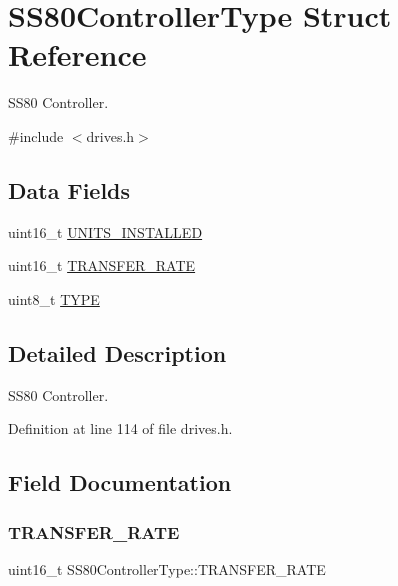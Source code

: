 \hypertarget{structSS80ControllerType}{}\section{S\+S80\+Controller\+Type Struct Reference}
\label{structSS80ControllerType}


S\+S80 Controller.  




{\ttfamily \#include $<$drives.\+h$>$}

\subsection*{Data Fields}
\begin{DoxyCompactItemize}
\item 
uint16\+\_\+t \hyperlink{structSS80ControllerType_a0868c32b362ef2af2ac64fa16aee8aae}{U\+N\+I\+T\+S\+\_\+\+I\+N\+S\+T\+A\+L\+L\+ED}
\item 
uint16\+\_\+t \hyperlink{structSS80ControllerType_a98a3f1a7de63398531426b5781cb0090}{T\+R\+A\+N\+S\+F\+E\+R\+\_\+\+R\+A\+TE}
\item 
uint8\+\_\+t \hyperlink{structSS80ControllerType_a255739680bca0ad3b4d1346cf5017332}{T\+Y\+PE}
\end{DoxyCompactItemize}


\subsection{Detailed Description}
S\+S80 Controller. 

Definition at line 114 of file drives.\+h.



\subsection{Field Documentation}
\mbox{\label{structSS80ControllerType_a98a3f1a7de63398531426b5781cb0090}} 
\subsubsection{\texorpdfstring{T\+R\+A\+N\+S\+F\+E\+R\+\_\+\+R\+A\+TE}{TRANSFER\_RATE}}
{\footnotesize\ttfamily uint16\+\_\+t S\+S80\+Controller\+Type\+::\+T\+R\+A\+N\+S\+F\+E\+R\+\_\+\+R\+A\+TE}



